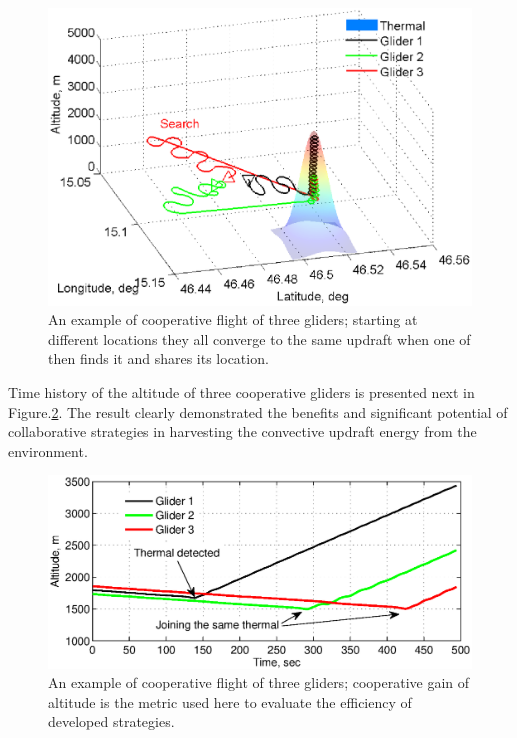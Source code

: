 \documentclass{ifacconf}
\begin{document}
\begin{figure}[thpb]
  \centering
  \includegraphics[scale=0.45]{Figures/paths_cooperative_flight.eps}
  \caption{An example of cooperative flight of three gliders; starting at different locations they all converge to the same updraft when one of then finds it and shares its location.}
  \label{fig:CoopFlightPaths}
\end{figure}
Time history of the altitude of three cooperative gliders is presented next in Figure.\ref{fig:CoopFlightHeight}. The result clearly demonstrated the benefits and significant potential of collaborative strategies in harvesting the convective updraft energy from the environment.

\begin{figure}[thpb]
  \centering
  \includegraphics[scale=0.525]{Figures/Coop_gain_altitude.eps}
  \caption{An example of cooperative flight of three gliders; cooperative gain of altitude is the metric used here to evaluate the efficiency of developed strategies.}
  \label{fig:CoopFlightHeight}
\end{figure}
\end{document}
